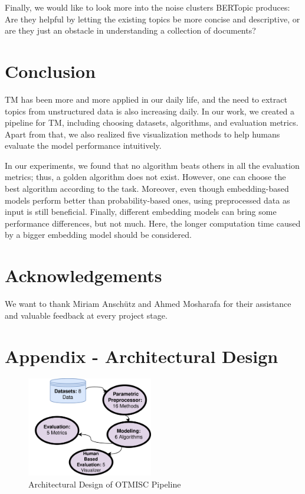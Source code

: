 \documentclass[11pt]{article}
\begin{document}
Finally, we would like to look more into the noise clusters BERTopic produces: Are they helpful by letting the existing topics be more concise and descriptive, or are they just an obstacle in understanding a collection of documents?

\section{Conclusion}
\label{sec:conclusion}
TM has been more and more applied in our daily life, and the need to extract topics from unstructured data is also increasing daily. In our work, we created a pipeline for TM, including choosing datasets, algorithms, and evaluation metrics. Apart from that, we also realized five visualization methods to help humans evaluate the model performance intuitively.

In our experiments, we found that no algorithm beats others in all the evaluation metrics; thus, a golden algorithm does not exist. However, one can choose the best algorithm according to the task. Moreover, even though embedding-based models perform better than probability-based ones, using preprocessed data as input is still beneficial. Finally, different embedding models can bring some performance differences, but not much. Here, the longer computation time caused by a bigger embedding model should be considered.


\nocite{*}

\section*{Acknowledgements}
We want to thank Miriam Anschütz and Ahmed Mosharafa for their assistance and valuable feedback at every project stage.




\newpage

\appendix

\section{Appendix - Architectural Design}
\label{sec:app_architecture}

\begin{figure}[ht]
\includegraphics[width=5.5cm]{Figures/architecture_vertical.png}
\centering
\caption{Architectural Design of OTMISC Pipeline}
\label{fig:architecture}
\end{figure}
\end{document}
